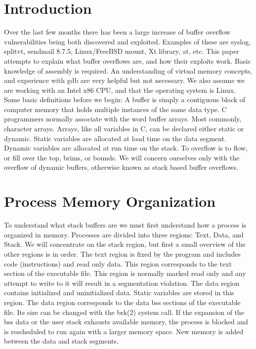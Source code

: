 \documentclass[10pt]{article}
\begin{document}
\section{Introduction}
Over the last few months there has been a large increase of buffer overflow vulnerabilities being both discovered and exploited. Examples of these are syslog, splitvt, sendmail 8.7.5, Linux/FreeBSD mount, Xt library, at, etc. This paper attempts to explain what buffer overflows are, and how their exploits work. Basic  knowledge of assembly is required. An understanding of virtual memory concepts, and experience with gdb are  very helpful but not necessary. We also assume we are working with an Intel x86 CPU, and that the operating  system is Linux. Some basic definitions before we begin: A buffer is simply a contiguous block of computer  memory that holds multiple instances of  the same data type. C programmers normally associate with the word  buffer arrays. Most commonly, character arrays. Arrays, like all variables in C,  can be declared either static or  dynamic. Static variables are allocated at load time on the data segment. Dynamic variables are allocated at  run  time on the stack. To overflow is to flow, or fill over the top, brims, or bounds.
We will concern ourselves only  with the overflow of dynamic buffers,
otherwise known as stack based buffer overflows.

\section{Process Memory Organization}

To understand what stack buffers are we must first understand how a process is organized in memory. Processes 
are divided into three regions: Text, Data, and Stack. We will concentrate on the stack region, but first a small 
overview of the other regions is in order. The text region is fixed by the program and includes code 
(instructions) and read only data. This region corresponds to the text section of the executable file. This region is normally marked read only and any attempt to write to it will result in a segmentation violation. The data 
region contains initialized and uninitialized data. Static variables are stored in this region. The data region 
corresponds to the data bss sections of the executable file. Its size can be changed with the brk(2) system call. If 
the expansion of the bss data or the user stack exhausts available memory, the process is blocked and is 
rescheduled to run again with a larger memory space. New memory is added between the data and stack 
segments.
\end{document}
